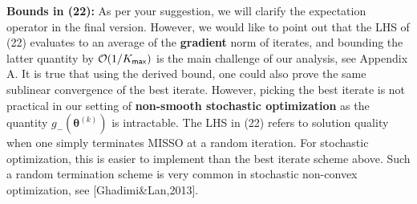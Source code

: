 \documentclass{article}
\begin{document}
\textbf{Bounds in (22):} As per your suggestion, we will clarify the expectation operator in the final version. However, we would like to point out that the LHS of (22) evaluates to an average of the \textbf{gradient} norm of iterates, and bounding the latter quantity by ${\cal O}(1/K_{\sf max})$ is the main challenge of our analysis, see Appendix A. It is true that using the derived bound, one could also prove the same sublinear convergence of the best iterate. However, picking the best iterate is not practical in our setting of \textbf{non-smooth stochastic optimization} as the quantity $g_-( \bm{\theta}^{(k)} )$ is intractable. 
The LHS in (22) refers to solution quality when one simply terminates MISSO at a random iteration. For stochastic optimization, this is easier to implement than the best iterate scheme above. Such a random termination scheme is very common in stochastic non-convex optimization, see [Ghadimi\&Lan,2013]. 
\end{document}
